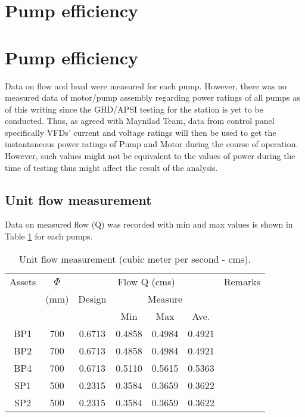 \section{Pump efficiency} \label{ch04mech03}\section{Pump efficiency} \label{ch04mech03}
Data on flow and head were measured for each pump. However, there was no measured data of motor/pump assembly regarding power ratings of all pumps 
as of this writing since the GHD/APSI testing for the station is yet to be conducted. 
Thus, as agreed with Maynilad Team, data from control panel specifically VFDs' current and voltage ratings will then be used to get the instantaneous power ratings of Pump and Motor during the course of operation.
However, such values might not be equivalent to the values of power during the time of testing thus might affect the result of the analysis.

\subsection{Unit flow measurement} \label{ch04mech04}
Data on measured flow (Q) was recorded with min and max values is shown in Table \ref{ch04_tbl_flow01} for each pumps. %

\begin{table}[!h]
	\caption{Unit flow measurement (cubic meter per second - cms).}
	\label{ch04_tbl_flow01}
	{\footnotesize
\begin{tabular}{c|c|c|c|c|c|l}
	\hline
Assets & $\Phi$  & \multicolumn{4}{c|}{Flow Q (cms)} & \multicolumn{1}{c}{Remarks} \\ 
\cline{3-6}
 & (mm) & Design & \multicolumn{3}{c|}{Measure} & \multicolumn{1}{c}{} \\ 
\cline{4-6}
 &  &  & Min & Max & Ave. & \multicolumn{1}{c}{} \\ 
\hline
BP1 & 700 & 0.6713 & 0.4858 & 0.4984 & 0.4921 & \multicolumn{1}{c}{} \\ 
BP2 & 700 & 0.6713 & 0.4858 & 0.4984 & 0.4921 & \multicolumn{1}{c}{} \\ 
BP4 & 700 & 0.6713 & 0.5110 & 0.5615 & 0.5363 & \multicolumn{1}{c}{} \\ 
SP1 & 500 & 0.2315 & 0.3584 & 0.3659 & 0.3622 & \multicolumn{1}{c}{} \\ 
SP2 & 500 & 0.2315 & 0.3584 & 0.3659 & 0.3622 & \multicolumn{1}{c}{} \\ 
\hline
\end{tabular}

	}
\end{table}

